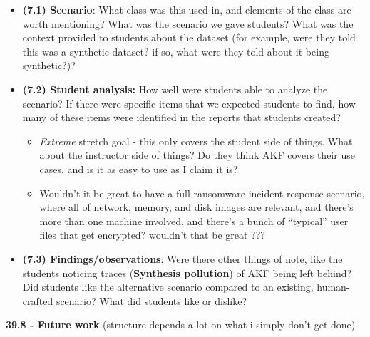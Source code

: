 \begin{itemize}
\tightlist
\item
  \textbf{(7.1) Scenario}: What class was this used in, and elements of
  the class are worth mentioning? What was the scenario we gave
  students? What was the context provided to students about the dataset
  (for example, were they told this was a synthetic dataset? if so, what
  were they told about it being synthetic?)?
\item
  \textbf{(7.2) Student analysis:} How well were students able to
  analyze the scenario? If there were specific items that we expected
  students to find, how many of these items were identified in the
  reports that students created?

  \begin{itemize}
  \tightlist
  \item
    \emph{Extreme} stretch goal - this only covers the student side of
    things. What about the instructor side of things? Do they think AKF
    covers their use cases, and is it as easy to use as I claim it is?
  \item
    Wouldn't it be great to have a full ransomware incident response
    scenario, where all of network, memory, and disk images are
    relevant, and there's more than one machine involved, and there's a
    bunch of ``typical'' user files that get encrypted? wouldn't that be
    great ???
  \end{itemize}
\item
  \textbf{(7.3) Findings/observations}: Were there other things of note,
  like the students noticing traces (\textbf{Synthesis pollution}) of
  AKF being left behind? Did students like the alternative scenario
  compared to an existing, human-crafted scenario? What did students
  like or dislike?
\end{itemize}

\textbf{39.8 - Future work} (structure depends a lot on what i simply
don't get done)

